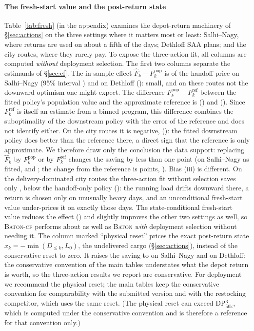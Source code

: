 \documentclass[preprint,authoryear,12pt]{elsarticle}
\theoremstyle{definition}
\theoremstyle{remark}
\begin{document}
\paragraph{The fresh-start value and the post-return state}
Table~\ref{tab:fresh} (in the appendix) examines the depot-return machinery of
\S\ref{sec:actions} on the three settings where it matters most or
least: Salhi--Nagy, where returns are used on about a fifth of the days;
Dethloff \textsc{SAA} plans; and the city routes, where they rarely
pay. To expose the three-action fit, all columns are computed
\emph{without} deployment selection. The first two columns separate the
estimands of \S\ref{sec:cf}. The in-sample effect $\widehat F_k -
F^{\mathrm{pop}}_k$ is \frSalhiInEff{} of the handoff price on
Salhi--Nagy (95\% interval \frSalhiInEffCI) and \frDethInEff{} on
Dethloff (\frDethInEffCI): small, and on these routes not the downward
optimism one might expect. The difference $F^{\mathrm{pop}}_k -
F^{\mathrm{ref}}_k$ between the fitted policy's population value and the
approximate reference is \frSalhiDsEff{} (\frSalhiDsEffCI) and
\frDethDsEff{} (\frDethDsEffCI). Since $F^{\mathrm{ref}}_k$ is itself an
estimate from a binned program, this difference combines the
suboptimality of the downstream policy with the error of the reference
and does not identify either. On the city routes it is negative,
\frCityDsEff{} (\frCityDsEffCI): the fitted downstream policy does
better than the reference there, a direct sign that the reference is
only approximate. We therefore draw only the conclusion the
data support: replacing $\widehat F_k$ by $F^{\mathrm{pop}}_k$ or by
$F^{\mathrm{ref}}_k$ changes the saving by less than one point (on Salhi--Nagy
\frSalhiThree{} as fitted, \frSalhiFout{} and \frSalhiFstar{}; the change
from the reference is \frSalhiDeltaF{} points, \frSalhiDeltaFCI). Bias
(iii) is different. On the delivery-dominated city routes the
three-action fit without selection saves only \frCityThree{}, below the
handoff-only policy (\frCityHo{}): the running load drifts downward
there, a return is chosen only on unusually heavy days, and an
unconditional fresh-start value under-prices it on exactly those days.
The state-conditional fresh-start value reduces the effect (\frCityCf{})
and slightly improves the other two settings as well, so
\textsc{Baton-cf} performs about as well as \textsc{Baton} \emph{with}
deployment selection without needing it. The column marked ``physical
reset'' prices the exact post-return state $x_k = -\min(D_{\le k},
L_0)$, the undelivered cargo (\S\ref{sec:actions}), instead of the
conservative reset to zero. It raises the saving to \frSalhiExact{} on
Salhi--Nagy and \frDethExact{} on Dethloff: the conservative convention
of the main tables understates what the depot return is worth, so the
three-action results we report are conservative. For deployment we
recommend the physical reset; the main tables keep the conservative
convention for comparability with the submitted version and with the
restocking competitor, which uses the same reset. (The physical reset
can exceed DP$^3_{50\mathrm{k}}$, which is computed under the
conservative convention and is therefore a reference for that
convention only.)
\end{document}
